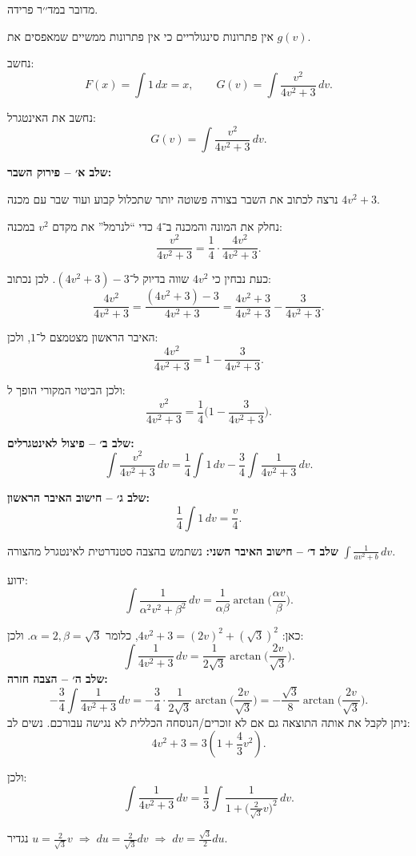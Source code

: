 \documentclass{article}
\numberwithin{equation}{section}
\begin{document}
מדובר במד׳׳ר פרידה.  

אין פתרונות סינגולריים כי אין פתרונות ממשיים שמאפסים את $g(v)$.

נחשב:
\[
F(x)=\int 1\,dx = x, 
\qquad 
G(v)=\int \frac{v^2}{4v^2+3}\,dv.
\]

נחשב את האינטגרל:
\[
G(v) = \int \frac{v^2}{4v^2+3}\,dv.
\]

\textbf{שלב א׳ – פירוק השבר:}  
 
נרצה לכתוב את השבר בצורה פשוטה יותר שתכלול קבוע ועוד שבר עם מכנה $4v^2+3$.

נחלק את המונה והמכנה ב־$4$ כדי “לנרמל” את מקדם $v^2$ במכנה:
\[
\frac{v^2}{4v^2+3} 
= \frac{1}{4}\cdot \frac{4v^2}{4v^2+3}.
\]

כעת נבחין כי $4v^2$ שווה בדיוק ל־$(4v^2+3)-3$.  
לכן נכתוב:
\[
\frac{4v^2}{4v^2+3} 
= \frac{(4v^2+3)-3}{4v^2+3} 
= \frac{4v^2+3}{4v^2+3} - \frac{3}{4v^2+3}.
\]

האיבר הראשון מצטמצם ל־$1$, ולכן:
\[
\frac{4v^2}{4v^2+3} = 1 - \frac{3}{4v^2+3}.
\]

ולכן הביטוי המקורי הופך ל:
\[
\frac{v^2}{4v^2+3} 
= \frac{1}{4}\Bigg(1 - \frac{3}{4v^2+3}\Bigg).
\]


\textbf{שלב ב׳ – פיצול לאינטגרלים:}
\[
\int \frac{v^2}{4v^2+3}\,dv
= \frac{1}{4}\int 1\,dv - \frac{3}{4}\int \frac{1}{4v^2+3}\,dv.
\]

\textbf{שלב ג׳ – חישוב האיבר הראשון:}
\[
\frac{1}{4}\int 1\,dv = \frac{v}{4}.
\]

\textbf{שלב ד׳ – חישוב האיבר השני:}  
נשתמש בהצבה סטנדרטית לאינטגרל מהצורה $\int \tfrac{1}{av^2+b}\,dv$.

ידוע:
\[
\int \frac{1}{\alpha^2 v^2+\beta^2}\,dv 
= \frac{1}{\alpha\beta}\arctan\Big(\frac{\alpha v}{\beta}\Big).
\]

כאן: $4v^2+3 = (2v)^2+(\sqrt{3})^2$, כלומר $\alpha=2, \beta=\sqrt{3}$.  
ולכן:
\[
\int \frac{1}{4v^2+3}\,dv = \frac{1}{2\sqrt{3}} \arctan\Big(\frac{2v}{\sqrt{3}}\Big).
\]
\textbf{שלב ה׳ – הצבה חזרה:}
\[
-\frac{3}{4}\int \frac{1}{4v^2+3}\,dv
= -\frac{3}{4}\cdot \frac{1}{2\sqrt{3}}\arctan\Big(\frac{2v}{\sqrt{3}}\Big)
= -\frac{\sqrt{3}}{8}\arctan\Big(\frac{2v}{\sqrt{3}}\Big).
\]
ניתן לקבל את אותה התוצאה גם אם לא זוכרים/הנוסחה הכללית לא נגישה עבורכם.
נשים לב:
\[
4v^2+3 = 3\left(1+\frac{4}{3}v^2\right).
\]

ולכן:
\[
\int \frac{1}{4v^2+3}\,dv = \frac{1}{3}\int \frac{1}{1+\big(\tfrac{2}{\sqrt{3}}v\big)^2}\,dv.
\]

נגדיר \(u=\tfrac{2}{\sqrt{3}}v \;\Rightarrow\; du=\tfrac{2}{\sqrt{3}}dv \;\Rightarrow\; dv=\tfrac{\sqrt{3}}{2}du\).
\end{document}
